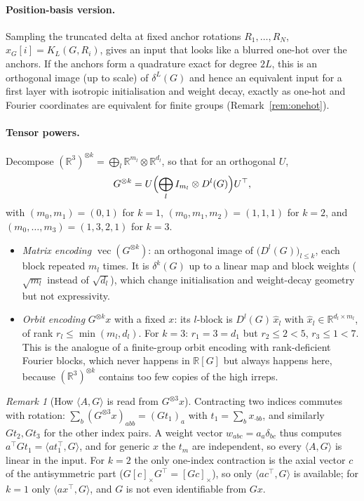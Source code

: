 \documentclass[a4paper,11pt]{article}
\theoremstyle{remark}
\newtheorem{remark}[proposition]{Remark}
\theoremstyle{definition}
\newcommand{\R}{\mathbb{R}}
\newcommand{\vect}{\operatorname{vec}}
\newcommand{\ip}[2]{\langle #1, #2 \rangle}
\begin{document}
\paragraph{Position-basis version.} Sampling the truncated delta at fixed anchor
rotations $R_1,\dots,R_N$, $x_G[i]=K_L(G,R_i)$, gives an input that looks like a
blurred one-hot over the anchors. If the anchors form a quadrature exact for
degree $2L$, this is an orthogonal image (up to scale) of $\delta^L(G)$ and hence
an equivalent input for a first layer with isotropic initialisation and weight
decay, exactly as one-hot and Fourier coordinates are equivalent for finite
groups (Remark~\ref{rem:onehot}).

\paragraph{Tensor powers.} Decompose $(\R^3)^{\otimes k}=\bigoplus_l
\R^{m_l}\otimes\R^{d_l}$, so that for an orthogonal $U$,
\begin{equation}\label{eq:tensor}
G^{\otimes k}=U\Bigl(\bigoplus_l I_{m_l}\otimes D^l(G)\Bigr)U^\top,
\end{equation}
with $(m_0,m_1)=(0,1)$ for $k=1$, $(m_0,m_1,m_2)=(1,1,1)$ for $k=2$, and
$(m_0,\dots,m_3)=(1,3,2,1)$ for $k=3$.
\begin{itemize}
\item \emph{Matrix encoding} $\vect(G^{\otimes k})$: an orthogonal image of
  $\bigl(D^l(G)\bigr)_{l\le k}$, each block repeated $m_l$ times. It is
  $\delta^k(G)$ up to a linear map and block weights ($\sqrt{m_l}$ instead of
  $\sqrt{d_l}$), which change initialisation and weight-decay geometry but not
  expressivity.
\item \emph{Orbit encoding} $G^{\otimes k}x$ with a fixed $x$: its $l$-block is
  $D^l(G)\,\hat x_l$ with $\hat x_l\in\R^{d_l\times m_l}$, of rank
  $r_l\le\min(m_l,d_l)$. For $k=3$: $r_1=3=d_1$ but $r_2\le2<5$, $r_3\le1<7$.
  This is the analogue of a finite-group orbit encoding with rank-deficient
  Fourier blocks, which never happens in $\R[G]$ but always happens here,
  because $(\R^3)^{\otimes k}$ contains too few copies of the high irreps.
\end{itemize}

\begin{remark}[How $\ip{A}{G}$ is read from $G^{\otimes 3}x$]
Contracting two indices commutes with rotation: $\sum_b (G^{\otimes3}x)_{abb}
=(Gt_1)_a$ with $t_1=\sum_b x_{\cdot bb}$, and similarly $Gt_2,Gt_3$ for the
other index pairs. A weight vector $w_{abc}=a_a\delta_{bc}$ thus computes
$a^\top Gt_1=\ip{at_1^\top}{G}$, and for generic $x$ the $t_m$ are independent,
so every $\ip{A}{G}$ is linear in the input. For $k=2$ the only one-index
contraction is the axial vector $c$ of the antisymmetric part
($G[c]_\times G^\top=[Gc]_\times$), so only $\ip{ac^\top}{G}$ is available; for
$k=1$ only $\ip{ax^\top}{G}$, and $G$ is not even identifiable from $Gx$.
\end{remark}
\end{document}
